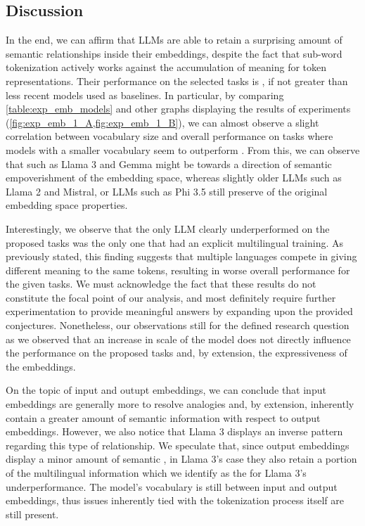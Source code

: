\subsection{Discussion}\label{ssec:exp_emb_discussion}

In the end, we can affirm that LLMs are able to retain a surprising amount of semantic relationships inside their embeddings, despite the fact that sub-word tokenization actively works against the accumulation of meaning for token representations.
Their performance on the selected tasks is , if not greater than less recent models used as baselines.
In particular, by comparing \cref{table:exp_emb_models} and other graphs displaying the results of experiments (\cref{fig:exp_emb_1_A,fig:exp_emb_1_B}), we can almost observe a slight correlation between vocabulary size and overall performance on tasks where models with a smaller vocabulary seem to outperform .
From this, we can observe that  such as Llama 3 and Gemma might be  towards a direction of semantic empoverishment of the embedding space, whereas slightly older LLMs such as Llama 2 and Mistral, or LLMs  such as Phi 3.5 still preserve  of the original embedding space properties.

Interestingly, we observe that the only LLM  clearly underperformed on the proposed tasks was the only one that had an explicit multilingual training.
As previously stated, this finding suggests that multiple languages compete in giving different meaning to the same tokens, resulting in worse overall performance for the given tasks.
We must acknowledge the fact that these results do not constitute the focal point of our analysis, and most definitely require further experimentation to provide meaningful answers by expanding upon the provided conjectures.
Nonetheless, our observations still  for the defined research question as we observed that an increase in scale of the model does not directly influence the performance on the proposed tasks and, by extension, the expressiveness of the embeddings.

On the topic of input and outupt embeddings, we can conclude that input embeddings are generally more  to resolve analogies and, by extension, inherently contain a greater amount of semantic information with respect to output embeddings.
However, we also notice that Llama 3 displays an inverse pattern regarding this type of relationship.
We speculate that, since output embeddings display a minor amount of semantic , in Llama 3's case they also retain a  portion of the multilingual information which we identify as the  for Llama 3's underperformance.
The model's vocabulary is still  between input and output embeddings, thus issues inherently tied with the tokenization process itself are still present.

